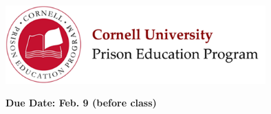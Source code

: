 \documentclass[addpoints,12pt]{exam}
\begin{document}

\begin{flushright}
\vspace{0.2in}

\end{flushright}

\begin{center}
\includegraphics[width=10cm]{../images/logo.png}
\end{center}

\begin{center}
\end{center}

\noindent\begin{large}\textbf{Due Date: Feb. 9 (before class)}\end{large}
\vspace{0.2in}
\end{document}
